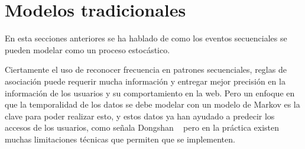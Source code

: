 \section{Modelos tradicionales}

%
En esta secciones anteriores se ha hablado de como los eventos secuenciales se pueden modelar como un proceso estocástico.

Ciertamente el uso de reconocer frecuencia en patrones secuenciales, reglas de asociación puede requerir mucha  información y entregar mejor precisión en la información de los usuarios y su comportamiento en la web. Pero un enfoque en que la temporalidad de los datos se debe modelar con un modelo de Markov es la clave para poder realizar esto, y estos datos ya han ayudado a predecir los accesos de los usuarios, como señala Dongshan \etal~\cite{Dongshan2002} pero en la práctica existen muchas limitaciones técnicas que permiten que se implementen. 


 





